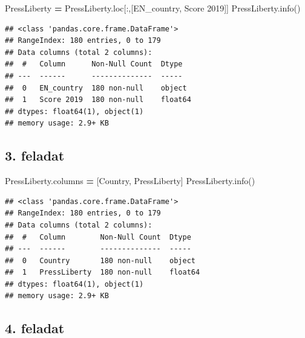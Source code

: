 \documentclass[
]{book}
\newenvironment{Shaded}{\begin{snugshade}}{\end{snugshade}}
\newcommand{\NormalTok}[1]{#1}
\newcommand{\OperatorTok}[1]{\textcolor[rgb]{0.81,0.36,0.00}{\textbf{#1}}}
\newcommand{\StringTok}[1]{\textcolor[rgb]{0.31,0.60,0.02}{#1}}
\begin{document}
\begin{Shaded}
\begin{Highlighting}[]
\NormalTok{PressLiberty }\OperatorTok{=}\NormalTok{ PressLiberty.loc[:,[}\StringTok{\textquotesingle{}EN\_country\textquotesingle{}}\NormalTok{, }\StringTok{\textquotesingle{}Score 2019\textquotesingle{}}\NormalTok{]]}
\NormalTok{PressLiberty.info()}
\end{Highlighting}
\end{Shaded}

\begin{verbatim}
## <class 'pandas.core.frame.DataFrame'>
## RangeIndex: 180 entries, 0 to 179
## Data columns (total 2 columns):
##  #   Column      Non-Null Count  Dtype  
## ---  ------      --------------  -----  
##  0   EN_country  180 non-null    object 
##  1   Score 2019  180 non-null    float64
## dtypes: float64(1), object(1)
## memory usage: 2.9+ KB
\end{verbatim}

\subsection*{3. feladat}\label{feladat-2}

\begin{Shaded}
\begin{Highlighting}[]
\NormalTok{PressLiberty.columns }\OperatorTok{=}\NormalTok{ [}\StringTok{\textquotesingle{}Country\textquotesingle{}}\NormalTok{, }\StringTok{\textquotesingle{}PressLiberty\textquotesingle{}}\NormalTok{]}
\NormalTok{PressLiberty.info()}
\end{Highlighting}
\end{Shaded}

\begin{verbatim}
## <class 'pandas.core.frame.DataFrame'>
## RangeIndex: 180 entries, 0 to 179
## Data columns (total 2 columns):
##  #   Column        Non-Null Count  Dtype  
## ---  ------        --------------  -----  
##  0   Country       180 non-null    object 
##  1   PressLiberty  180 non-null    float64
## dtypes: float64(1), object(1)
## memory usage: 2.9+ KB
\end{verbatim}

\subsection*{4. feladat}\label{feladat-3}
\end{document}

